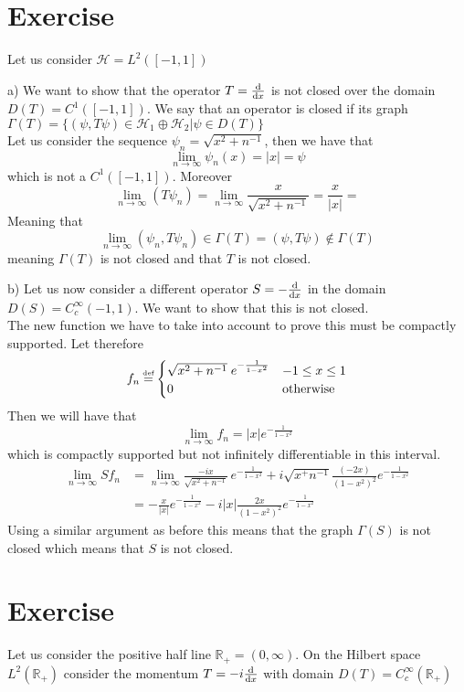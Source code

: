 \documentclass{article}
\newcommand{\R}{\mathbb{R}}
\newcommand*{\eqdef}{\ensuremath{\overset{\mathclap{\text{\tiny def}}}{=}}}
\begin{document}
\section{Exercise}
Let us consider $\mathcal H = L^2([-1,1])$

a) We want to show that the operator $T = \odv{}{x}$ is not closed over the domain $D(T) = C^1([-1,1])$. We say that an operator is closed if its graph $\Gamma (T) = \{ (\psi, T \psi) \in \mathcal H_1 \oplus \mathcal H_2 | \psi \in D(T)  \}$ \\
Let us consider the sequence $\psi_n = \sqrt{x^2 + n^{-1}}$, then we have that 
\[
    \lim_{n \to \infty} \psi_n (x) = |x| = \psi
\]
which is not a $C^1([-1, 1])$. Moreover
\[
\lim_{n \to \infty} (T\psi_n) = \lim_{n \to \infty} \frac{x}{\sqrt{x^2 +n^{-1}}} = \frac{x}{|x|} =
\]
Meaning that 
\[
    \lim_{n\to \infty} (\psi_n, T\psi_n) \in \Gamma(T) = (\psi, T\psi) \notin \Gamma(T)
\]
meaning $\Gamma (T)$ is not closed and that $T$ is not closed.

b) Let us now consider a different operator $S = -\odv{}{x}$ in the domain $D(S) = C_c^\infty ({-1,1})$. We want to show that this is not closed.\\
The new function we have to take into account to prove this must be compactly supported. Let therefore
\[
    f_n \eqdef \begin{cases}
        \sqrt{x^2 +n^{-1}}\; e^{-\frac{1}{1-x^2}} & -1 \leq x \leq 1\\
        0 & \text{otherwise}
    \end{cases}
\]
Then we will have that
\[
    \lim_{n \to \infty} f_n = |x| e^{-\frac{1}{1-x^2}}
\]
which is compactly supported but not infinitely differentiable in this interval. 
\[
    \begin{split}
        \lim_{n \to \infty} Sf_n & = \lim_{n \to \infty} \frac{-ix}{\sqrt{x^2+n^{-1}}} \, e^{-\frac{1}{1-x^2}} + i \sqrt{x^+n^{-1}} \frac{(-2x)}{(1-x^2)^2} e^{-\frac{1}{1-x^2}}\\
        & =-\frac{x}{|x|} e^{-\frac{1}{1-x^2}} - i |x| \frac{2x}{(1-x^2)^2} e^{-\frac{1}{1-x^2}}
    \end{split}
\]
Using a similar argument as before this means that the graph $\Gamma(S)$ is not closed which means that $S$ is not closed.

\section{Exercise}

Let us consider the positive half line $\R_+ = (0, \infty)$. On the Hilbert space $L^2(\R_+)$  consider the momentum $T = -i \odv{}{x}$ with domain $D(T) = C_c^\infty (\R_+)$
\end{document}
